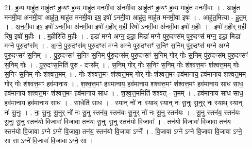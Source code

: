 \documentclass[17pt]{extarticle}
\begin{document}
21. ह॒व्य माहु॑त॒ माहु॑तꣳ ह॒व्यꣳ ह॒व्य माहु॑त मनमी॒वा अ॑नमी॒वा आहु॑तꣳ ह॒व्यꣳ ह॒व्य माहु॑त मनमी॒वाः । . आहु॑त मनमी॒वा अ॑नमी॒वा आहु॑त॒ माहु॑त मनमी॒वा इष॒ इषो॑ ऽनमी॒वा आहु॑त॒ माहु॑त मनमी॒वा इषः॑ । . आहु॑त॒मित्या - हु॒त॒म् । . अ॒न॒मी॒वा इष॒ इषो॑ ऽनमी॒वा अ॑नमी॒वा इषो॑ म॒हीर् म॒ही रिषो॑ ऽनमी॒वा अ॑नमी॒वा इषो॑ म॒हीः । . इषो॑ म॒हीर् म॒ही रिष॒ इषो॑ म॒हीः । . म॒हीरिति॑ म॒हीः । . इडा॑ मग्ने अग्न॒ इडा॒ मिडा॑ मग्ने पुरु॒दꣳस॑म् पुरु॒दꣳस॑ मग्न॒ इडा॒ मिडा॑ मग्ने पुरु॒दꣳस᳚म् । . अ॒ग्ने॒ पु॒रु॒दꣳस॑म् पुरु॒दꣳस॑ मग्ने अग्ने पुरु॒दꣳसꣳ॑ स॒निꣳ स॒निम् पु॑रु॒दꣳस॑ 
मग्ने अग्ने पुरु॒दꣳसꣳ॑ स॒निम् । . पु॒रु॒दꣳसꣳ॑ स॒निꣳ स॒निम् पु॑रु॒दꣳस॑म् पुरु॒दꣳसꣳ॑ स॒निम् गोर् गोः स॒निम् पु॑रु॒दꣳस॑म् पुरु॒दꣳसꣳ॑ स॒निम् गोः । . पु॒रु॒दꣳस॒मिति॑ पुरु - दꣳस᳚म् । . स॒निम् गोर् गोः स॒निꣳ स॒निम् गोः श॑श्वत्त॒मꣳ श॑श्वत्त॒मम् गोः स॒निꣳ स॒निम् गोः श॑श्वत्त॒मम् । . गोः श॑श्वत्त॒मꣳ श॑श्वत्त॒मम् गोर् गोः श॑श्वत्त॒मꣳ हव॑मानाय॒ हव॑मानाय शश्वत्त॒मम् गोर् गोः श॑श्वत्त॒मꣳ हव॑मानाय । . श॒श्व॒त्त॒मꣳ हव॑मानाय॒ हव॑मानाय शश्वत्त॒मꣳ श॑श्वत्त॒मꣳ हव॑मानाय साध साध॒ हव॑मानाय शश्वत्त॒मꣳ श॑श्वत्त॒मꣳ हव॑मानाय साध । . श॒श्व॒त्त॒ममिति॑ शश्वत् - त॒मम् । . हव॑मानाय साध साध॒ हव॑मानाय॒ हव॑मानाय साध । . सा॒धेति॑ साध । . स्यान् नो॑ नः॒ स्याथ् स्यान् नः॑ सू॒नुः सू॒नुर् नः॒ स्याथ् स्यान् नः॑ सू॒नुः । . नः॒ सू॒नुः सू॒नुर् नो॑ नः सू॒नु स्तन॑य॒ स्तन॑यः सू॒नुर् नो॑ नः सू॒नु स्तन॑यः । . सू॒नु स्तन॑य॒ स्तन॑यः सू॒नुः सू॒नु स्तन॑यो वि॒जावा॑ वि॒जावा॒ तन॑यः सू॒नुः सू॒नु स्तन॑यो वि॒जावा᳚ । . तन॑यो वि॒जावा॑ वि॒जावा॒ तन॑य॒ स्तन॑यो वि॒जावा ऽग्ने ऽग्ने॑ वि॒जावा॒ तन॑य॒ स्तन॑यो वि॒जावा ऽग्ने᳚ । . वि॒जावा ऽग्ने ऽग्ने॑ वि॒जावा॑ वि॒जावा ऽग्ने॒ सा सा ऽग्ने॑ वि॒जावा॑ वि॒जावा ऽग्ने॒ सा । \newline
\end{document}

